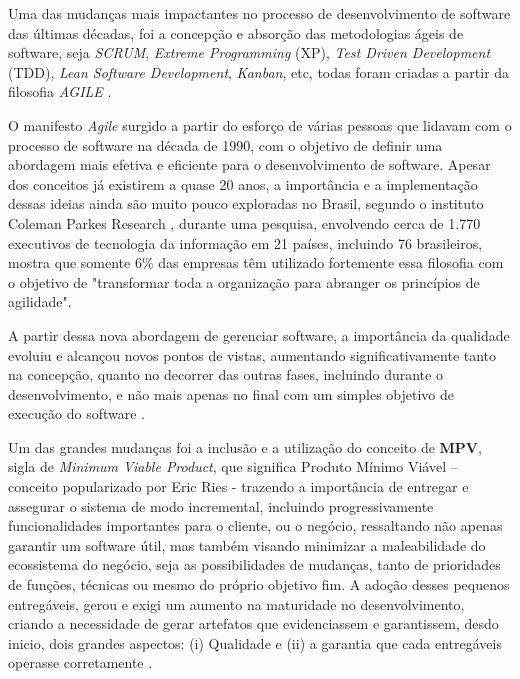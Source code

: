 \documentclass[12pt]{article}
\begin{document}
 Uma das mudanças mais impactantes no processo de desenvolvimento de software das últimas décadas, foi a concepção e absorção das metodologias ágeis de software, seja \textit{SCRUM}, \textit{Extreme Programming} (XP), \textit{Test Driven Development} (TDD), \textit{Lean Software Development}, \textit{Kanban}, etc, todas foram criadas a partir da filosofia \textit{AGILE} \cite{AGILE_X_LEAN}.
 
 O manifesto \textit{Agile} \cite{AGILE_X_LEANMANISFESTOAGILE} surgido a partir do esforço de várias pessoas que lidavam com o processo de software na década de 1990, com o objetivo de definir uma abordagem mais efetiva e eficiente para o desenvolvimento de software. Apesar dos conceitos já existirem a quase 20 anos, a importância e a implementação dessas ideias ainda são muito pouco exploradas no Brasil, segundo o instituto Coleman Parkes Research \cite{COLEMANPARKES_AGILE_2017}, durante uma pesquisa, envolvendo cerca de 1.770 executivos de tecnologia da informação em 21 países, incluindo 76 brasileiros, mostra que somente 6\% das empresas têm utilizado fortemente essa filosofia com o objetivo de "transformar toda a organização para abranger os princípios de agilidade".

 A partir dessa nova abordagem de gerenciar software, a importância da qualidade evoluiu e alcançou novos pontos de vistas, aumentando significativamente tanto na concepção, quanto no decorrer das outras fases, incluindo durante o desenvolvimento, e não mais apenas no final com um simples objetivo de execução do software \cite{WATERFALL_MODEL}.
 
 Um das grandes mudanças foi a inclusão e a utilização do conceito de \textbf{MPV}, sigla de \textit{Minimum Viable Product}, que significa Produto Mínimo Viável – conceito popularizado por Eric Ries \cite{ERICRIES_THELEAN} - trazendo a importância de entregar e assegurar o sistema de modo incremental, incluindo progressivamente funcionalidades importantes para o cliente, ou o negócio, ressaltando não apenas garantir um software útil, mas também visando minimizar a maleabilidade do ecossistema do negócio, seja as possibilidades de mudanças, tanto de prioridades de funções, técnicas ou mesmo do próprio objetivo fim. A adoção desses pequenos entregáveis, gerou e exigi um aumento na maturidade no desenvolvimento, criando a necessidade de gerar artefatos que evidenciassem e garantissem, desdo inicio, dois grandes aspectos: (i) Qualidade e (ii) a garantia que cada entregáveis operasse corretamente \cite{AGILE_WORKING_PROCESS}.
\end{document}
